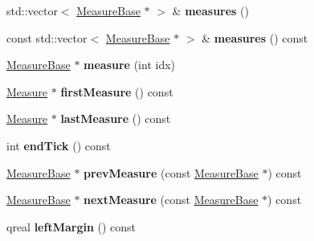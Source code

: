 \begin{DoxyCompactItemize}
\item 
\mbox{\label{class_ms_1_1_system_a2508220130c3a26a454a8c561692474c}} 
std\+::vector$<$ \hyperlink{class_ms_1_1_measure_base}{Measure\+Base} $\ast$ $>$ \& {\bfseries measures} ()
\item 
\mbox{\label{class_ms_1_1_system_ac553454381db73276ef7a4a4b1ebd30a}} 
const std\+::vector$<$ \hyperlink{class_ms_1_1_measure_base}{Measure\+Base} $\ast$ $>$ \& {\bfseries measures} () const
\item 
\mbox{\label{class_ms_1_1_system_a6ba93d243368e9e08b10ab5c1803bb70}} 
\hyperlink{class_ms_1_1_measure_base}{Measure\+Base} $\ast$ {\bfseries measure} (int idx)
\item 
\mbox{\label{class_ms_1_1_system_a706bf742c241c75854c66141cbba2ca5}} 
\hyperlink{class_ms_1_1_measure}{Measure} $\ast$ {\bfseries first\+Measure} () const
\item 
\mbox{\label{class_ms_1_1_system_aca7cbaa5dba797868bab81428164e673}} 
\hyperlink{class_ms_1_1_measure}{Measure} $\ast$ {\bfseries last\+Measure} () const
\item 
\mbox{\label{class_ms_1_1_system_a6435faac1b3f85ec5e9bb9073e31141e}} 
int {\bfseries end\+Tick} () const
\item 
\mbox{\label{class_ms_1_1_system_a0525264e4f15a6b32fac9a1da5605a08}} 
\hyperlink{class_ms_1_1_measure_base}{Measure\+Base} $\ast$ {\bfseries prev\+Measure} (const \hyperlink{class_ms_1_1_measure_base}{Measure\+Base} $\ast$) const
\item 
\mbox{\label{class_ms_1_1_system_a62775b6f80e03cc367a312869b51de80}} 
\hyperlink{class_ms_1_1_measure_base}{Measure\+Base} $\ast$ {\bfseries next\+Measure} (const \hyperlink{class_ms_1_1_measure_base}{Measure\+Base} $\ast$) const
\item 
\mbox{\label{class_ms_1_1_system_ad440df7f5d01eb8f57f7752a96a4a780}} 
qreal {\bfseries left\+Margin} () const
\item 
\mbox{\label{class_ms_1_1_system_ac9f354ce6b9ec6c6ed0579464b68daee}} 

\end{DoxyCompactItemize}
